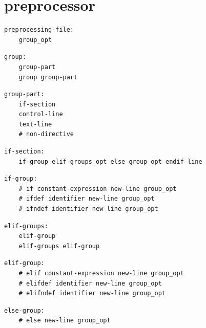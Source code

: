 \section{preprocessor}

\noindent\textbf{\texttt{}}\par
\begin{lstlisting}
preprocessing-file:
    group_opt
\end{lstlisting}

\noindent\textbf{\texttt{}}\par
\begin{lstlisting}
group:
    group-part
    group group-part
\end{lstlisting}

\noindent\textbf{\texttt{}}\par
\begin{lstlisting}
group-part:
    if-section
    control-line
    text-line
    # non-directive
\end{lstlisting}

\noindent\textbf{\texttt{}}\par
\begin{lstlisting}
if-section:
    if-group elif-groups_opt else-group_opt endif-line
\end{lstlisting}

\noindent\textbf{\texttt{}}\par
\begin{lstlisting}
if-group:
    # if constant-expression new-line group_opt
    # ifdef identifier new-line group_opt
    # ifndef identifier new-line group_opt
\end{lstlisting}

\noindent\textbf{\texttt{}}\par
\begin{lstlisting}
elif-groups:
    elif-group
    elif-groups elif-group
\end{lstlisting}

\noindent\textbf{\texttt{}}\par
\begin{lstlisting}
elif-group:
    # elif constant-expression new-line group_opt
    # elifdef identifier new-line group_opt
    # elifndef identifier new-line group_opt
\end{lstlisting}

\noindent\textbf{\texttt{}}\par
\begin{lstlisting}
else-group:
    # else new-line group_opt
\end{lstlisting}

